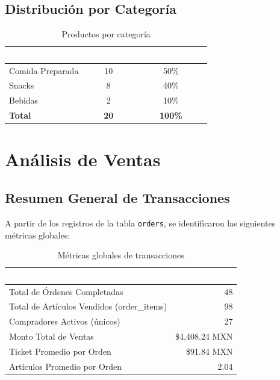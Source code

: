 \documentclass[12pt, a4paper]{article}
\begin{document}
\subsection{Distribución por Categoría}

\begin{table}[H]
\centering
\caption{Productos por categoría}
\begin{tabular}{l c c}
\toprule
\rowcolor{tableheader}
\textcolor{white}{\textbf{Categoría}} & \textcolor{white}{\textbf{Productos}} & \textcolor{white}{\textbf{\% del Catálogo}} \\
\midrule
Comida Preparada & 10 & 50\% \\
\rowcolor{rowalt}
Snacks & 8 & 40\% \\
Bebidas & 2 & 10\% \\
\midrule
\textbf{Total} & \textbf{20} & \textbf{100\%} \\
\bottomrule
\end{tabular}
\end{table}

\section{Análisis de Ventas}

\subsection{Resumen General de Transacciones}

A partir de los registros de la tabla \texttt{orders}, se identificaron las siguientes métricas globales:

\begin{table}[H]
\centering
\caption{Métricas globales de transacciones}
\begin{tabular}{l r}
\toprule
\rowcolor{tableheader}
\textcolor{white}{\textbf{Métrica}} & \textcolor{white}{\textbf{Valor}} \\
\midrule
Total de Órdenes Completadas & 48 \\
\rowcolor{rowalt}
Total de Artículos Vendidos (order\_items) & 98 \\
Compradores Activos (únicos) & 27 \\
\rowcolor{rowalt}
Monto Total de Ventas & \$4,408.24 MXN \\
Ticket Promedio por Orden & \$91.84 MXN \\
\rowcolor{rowalt}
Artículos Promedio por Orden & 2.04 \\
\bottomrule
\end{tabular}
\end{table}
\end{document}
